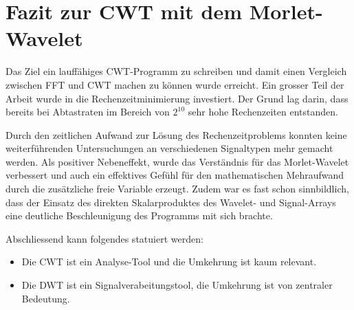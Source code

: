 %
%
%
%
\section{Fazit zur CWT mit dem Morlet-Wavelet
	\label{wavelets:section:teil6}}

Das Ziel ein lauffähiges CWT-Programm zu schreiben und damit einen
Vergleich zwischen FFT und CWT machen zu können wurde erreicht.
Ein grosser Teil der Arbeit wurde in die Rechenzeitminimierung
investiert.
Der Grund lag darin, dass bereits bei Abtastraten im Bereich von
$2^{10}$ sehr hohe Rechenzeiten entstanden.

Durch den zeitlichen Aufwand zur Lösung des Rechenzeitproblems
konnten keine weiterführenden Untersuchungen an verschiedenen
Signaltypen mehr gemacht werden.
Als positiver Nebeneffekt, wurde das Verständnis für das Morlet-Wavelet
verbessert und auch ein effektives Gefühl für den mathematischen
Mehraufwand durch die zusätzliche freie Variable erzeugt.
Zudem war es fast schon sinnbildlich, dass der Einsatz des direkten
Skalarproduktes des Wavelet- und Signal-Arrays eine deutliche
Beschleunigung des Programms mit sich brachte.

Abschliessend kann folgendes statuiert werden:

\begin{itemize}
	\item Die CWT ist ein Analyse-Tool und die Umkehrung ist kaum relevant.
	\item Die DWT ist ein Signalverabeitungstool, die Umkehrung
	ist von zentraler Bedeutung.
\end{itemize}
